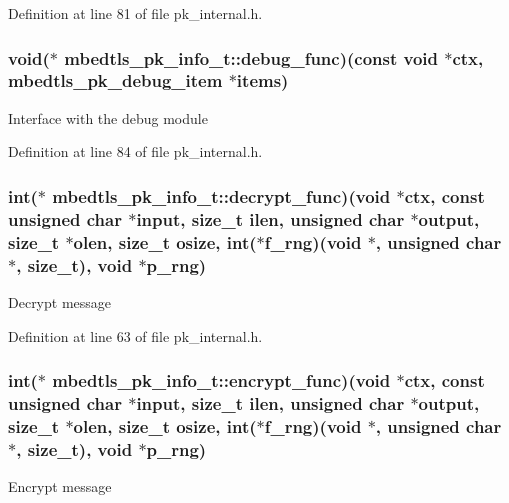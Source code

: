 Definition at line 81 of file pk\-\_\-internal.\-h.

\hypertarget{structmbedtls__pk__info__t_a6e50ba92ec8b18dc5568e125a834a808}{
\subsubsection[{debug\-\_\-func}]{\setlength{\rightskip}{0pt plus 5cm}void($\ast$ mbedtls\-\_\-pk\-\_\-info\-\_\-t\-::debug\-\_\-func)(const void $\ast$ctx, {\bf mbedtls\-\_\-pk\-\_\-debug\-\_\-item} $\ast$items)}}\label{structmbedtls__pk__info__t_a6e50ba92ec8b18dc5568e125a834a808}
Interface with the debug module 

Definition at line 84 of file pk\-\_\-internal.\-h.

\hypertarget{structmbedtls__pk__info__t_a8d9dce2cb92def64ed2fb99dfe79c914}{
\subsubsection[{decrypt\-\_\-func}]{\setlength{\rightskip}{0pt plus 5cm}int($\ast$ mbedtls\-\_\-pk\-\_\-info\-\_\-t\-::decrypt\-\_\-func)(void $\ast$ctx, const unsigned char $\ast$input, size\-\_\-t ilen, unsigned char $\ast$output, size\-\_\-t $\ast$olen, size\-\_\-t osize, int($\ast$f\-\_\-rng)(void $\ast$, unsigned char $\ast$, size\-\_\-t), void $\ast$p\-\_\-rng)}}\label{structmbedtls__pk__info__t_a8d9dce2cb92def64ed2fb99dfe79c914}
Decrypt message 

Definition at line 63 of file pk\-\_\-internal.\-h.

\hypertarget{structmbedtls__pk__info__t_a67f899cad3ca0fde066ad2b95ffcd3c3}{
\subsubsection[{encrypt\-\_\-func}]{\setlength{\rightskip}{0pt plus 5cm}int($\ast$ mbedtls\-\_\-pk\-\_\-info\-\_\-t\-::encrypt\-\_\-func)(void $\ast$ctx, const unsigned char $\ast$input, size\-\_\-t ilen, unsigned char $\ast$output, size\-\_\-t $\ast$olen, size\-\_\-t osize, int($\ast$f\-\_\-rng)(void $\ast$, unsigned char $\ast$, size\-\_\-t), void $\ast$p\-\_\-rng)}}\label{structmbedtls__pk__info__t_a67f899cad3ca0fde066ad2b95ffcd3c3}
Encrypt message 

